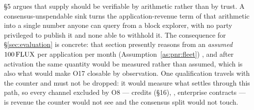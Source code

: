 \begin{remark}
\label{rem:pnr:counter}
\S5 argues that supply should be verifiable by arithmetic rather than by trust. A
consensus-unspendable sink turns the application-revenue term of that arithmetic into a single
number anyone can query from a block explorer, with no party privileged to publish it and none able
to withhold it. The consequence for \S\ref{sec:evaluation} is concrete: that section presently reasons from an
\emph{assumed} $100\,\mathrm{FLUX}$ per application per month (Assumption~\ref{as:pnr:fleet})
, and after activation the same quantity would be measured
rather than assumed, which is also what would make O17 closable by observation. One qualification
travels with the counter and must not be dropped: it would measure what settles through this path,
so every channel excluded by O8 --- credits (\S16), \CumulusVPN, enterprise contracts --- is revenue
the counter would not see and the consensus split would not touch.
\end{remark}

